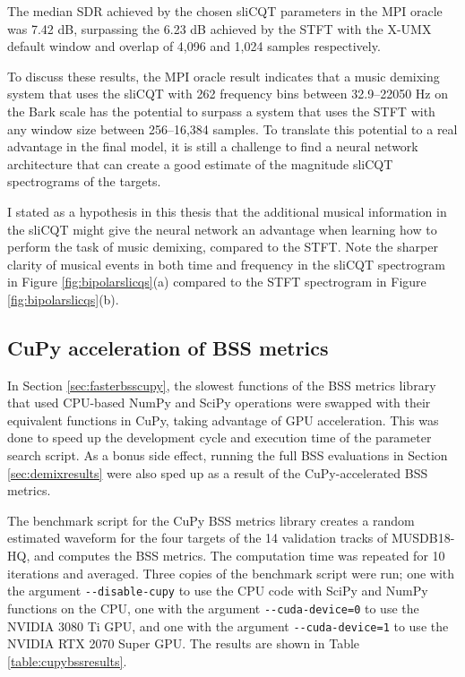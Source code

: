 \documentclass[report.tex]{subfiles}
\begin{document}
The median SDR achieved by the chosen sliCQT parameters in the MPI oracle was 7.42 dB, surpassing the 6.23 dB achieved by the STFT with the X-UMX default window and overlap of 4,096 and 1,024 samples respectively.

To discuss these results, the MPI oracle result indicates that a music demixing system that uses the sliCQT with 262 frequency bins between 32.9--22050 Hz on the Bark scale has the potential to surpass a system that uses the STFT with any window size between 256--16,384 samples. To translate this potential to a real advantage in the final model, it is still a challenge to find a neural network architecture that can create a good estimate of the magnitude sliCQT spectrograms of the targets.

I stated as a hypothesis in this thesis that the additional musical information in the sliCQT might give the neural network an advantage when learning how to perform the task of music demixing, compared to the STFT. Note the sharper clarity of musical events in both time and frequency in the sliCQT spectrogram in Figure \ref{fig:bipolarslicqs}(a) compared to the STFT spectrogram in Figure \ref{fig:bipolarslicqs}(b).

\subsection{CuPy acceleration of BSS metrics}
\label{sec:cupyportbss}

In Section \ref{sec:fasterbsscupy}, the slowest functions of the BSS metrics library that used CPU-based NumPy and SciPy operations were swapped with their equivalent functions in CuPy, taking advantage of GPU acceleration. This was done to speed up the development cycle and execution time of the parameter search script. As a bonus side effect, running the full BSS evaluations in Section \ref{sec:demixresults} were also sped up as a result of the CuPy-accelerated BSS metrics.

The benchmark script for the CuPy BSS metrics library creates a random estimated waveform for the four targets of the 14 validation tracks of MUSDB18-HQ, and computes the BSS metrics. The computation time was repeated for 10 iterations and averaged. Three copies of the benchmark script were run; one with the argument \Verb#--disable-cupy# to use the CPU code with SciPy and NumPy functions on the CPU, one with the argument \Verb#--cuda-device=0# to use the NVIDIA 3080 Ti GPU, and one with the argument \Verb#--cuda-device=1# to use the NVIDIA RTX 2070 Super GPU. The results are shown in Table \ref{table:cupybssresults}.
\end{document}
